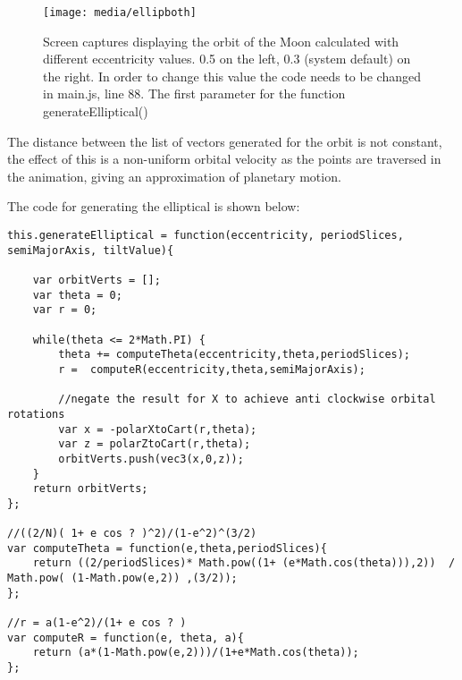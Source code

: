 \documentclass[titlepage]{article}
\begin{document}
\begin{figure}[h!]
                \centering
                \texttt{[image: media/ellipboth]}
                \caption{Screen captures displaying the orbit of the Moon calculated with different eccentricity values. 0.5 on the left, 0.3 (system default) on the right. In order to change this value the code needs to be changed in main.js, line 88. The first parameter for the function generateElliptical()}
            \end{figure}
\FloatBarrier
The distance between the list of vectors generated for the orbit is not constant, the effect of this is a non-uniform orbital velocity as the points are traversed in the animation, giving an approximation of planetary motion.

The code for generating the elliptical is shown below:

\begin{lstlisting}[caption=Above code can be found in OrbitUtils.js and is adapted from the formulas given in the assignment brief.]
this.generateElliptical = function(eccentricity, periodSlices, semiMajorAxis, tiltValue){

    var orbitVerts = [];
    var theta = 0;
    var r = 0;

    while(theta <= 2*Math.PI) {
        theta += computeTheta(eccentricity,theta,periodSlices);
        r =  computeR(eccentricity,theta,semiMajorAxis);

        //negate the result for X to achieve anti clockwise orbital rotations
        var x = -polarXtoCart(r,theta);
        var z = polarZtoCart(r,theta);
        orbitVerts.push(vec3(x,0,z));
    }
    return orbitVerts;
};

//((2/N)( 1+ e cos ? )^2)/(1-e^2)^(3/2)
var computeTheta = function(e,theta,periodSlices){
    return ((2/periodSlices)* Math.pow((1+ (e*Math.cos(theta))),2))  / Math.pow( (1-Math.pow(e,2)) ,(3/2));
};

//r = a(1-e^2)/(1+ e cos ? )
var computeR = function(e, theta, a){
    return (a*(1-Math.pow(e,2)))/(1+e*Math.cos(theta));
};
\end{lstlisting}
\end{document}
